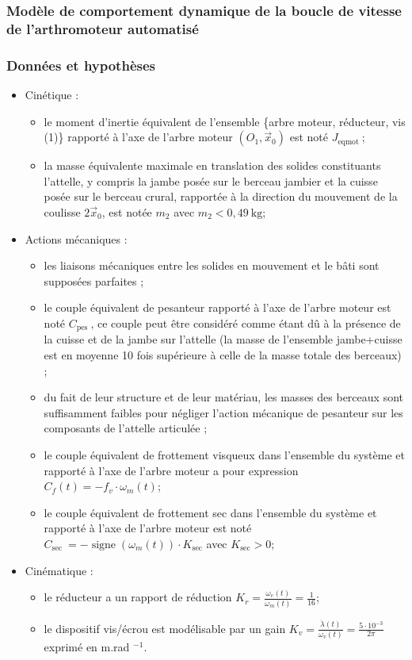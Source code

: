 \subsubsection{Modèle de comportement dynamique de la boucle de vitesse de l'arthromoteur automatisé}
 \subsubsection*{Données et hypothèses}
\begin{itemize}
  \item Cinétique :
\begin{itemize}
  \item le moment d'inertie équivalent de l'ensemble \{arbre moteur, réducteur, vis (1)\} rapporté à l'axe de l'arbre moteur $\left(O_{1}, \vec{x}_{0}\right)$ est noté $J_{\text {eqmot }}$;
  \item la masse équivalente maximale en translation des solides constituants l'attelle, y compris la jambe posée sur le berceau jambier et la cuisse posée sur le berceau crural, rapportée à la direction du mouvement de la coulisse $2 \vec{x}_{0}$, est notée $m_{2}$ avec $m_{2}<0,49 \mathrm{~kg}$;
\end{itemize}
  \item Actions mécaniques :
\begin{itemize}
  \item les liaisons mécaniques entre les solides en mouvement et le bâti sont supposées parfaites ;
  \item le couple équivalent de pesanteur rapporté à l'axe de l'arbre moteur est noté $C_{\text {pes }}$, ce couple peut être considéré comme étant dû à la présence de la cuisse et de la jambe sur l'attelle (la masse de l'ensemble jambe+cuisse est en moyenne 10 fois supérieure à celle de la masse totale des berceaux) ;
  \item du fait de leur structure et de leur matériau, les masses des berceaux sont suffisamment faibles pour négliger l'action mécanique de pesanteur sur les composants de l'attelle articulée ;
  \item le couple équivalent de frottement visqueux dans l'ensemble du système et rapporté à l'axe de l'arbre moteur a pour expression $C_{f}(t)=-f_{v} \cdot \omega_{m}(t)$;
  \item le couple équivalent de frottement sec dans l'ensemble du système et rapporté à l'axe de l'arbre moteur est noté $C_{\text {sec }}=-\operatorname{signe}\left(\omega_{m}(t)\right) \cdot K_{\mathrm{sec}}$ avec $K_{\mathrm{sec}}>0$;
\end{itemize}
\item Cinématique :
\begin{itemize}
  \item le réducteur a un rapport de réduction $K_{r}=\frac{\omega_{v}(t)}{\omega_{m}(t)}=\frac{1}{16}$;
  \item le dispositif vis/écrou est modélisable par un gain $K_{v}=\frac{\dot{\lambda}(t)}{\omega_{v}(t)}=\frac{5 \cdot 10^{-3}}{2 \pi}$ exprimé en m.rad ${ }^{-1}$.
\end{itemize}
\end{itemize}

